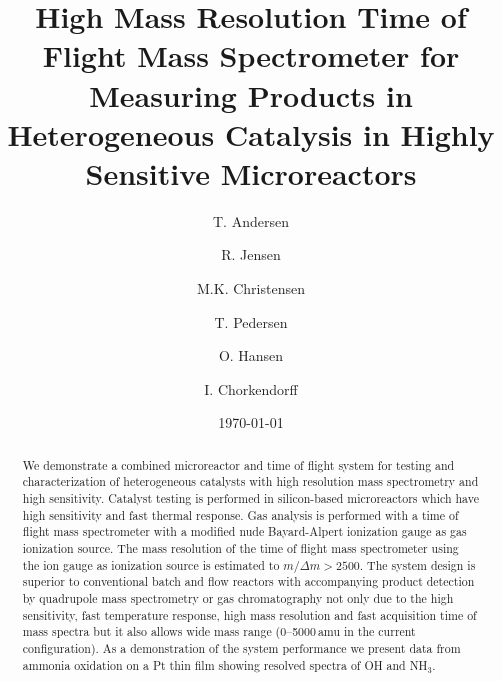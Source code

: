 \documentclass[aip,rsi]{revtex4-1}
\begin{document}
\title{High Mass Resolution Time of Flight Mass Spectrometer for Measuring Products in Heterogeneous Catalysis in Highly Sensitive Microreactors} 

\author{T. Andersen}
\author{R. Jensen}
\author{M.K. Christensen}
\author{T. Pedersen}
\author{O. Hansen}
\author{I. Chorkendorff}

\date{\today}

\begin{abstract}
We demonstrate a combined microreactor and time of flight system for testing and characterization of heterogeneous catalysts with high resolution mass spectrometry and high sensitivity. Catalyst testing is performed in silicon-based microreactors which have high sensitivity and fast thermal response. Gas analysis is performed with a time of flight mass spectrometer with a modified nude Bayard-Alpert ionization gauge as gas ionization source. The mass resolution of the time of flight mass spectrometer using the ion gauge as ionization source is estimated to $m/\Delta m>2500$. The system design is superior to conventional batch and flow reactors with accompanying product detection by quadrupole mass spectrometry or gas chromatography not only due to the high sensitivity, fast temperature response, high mass resolution and fast acquisition time of mass spectra but it also allows wide mass range (\mbox{0--5000}\,amu in the current configuration). As a demonstration of the system performance we present data from ammonia oxidation on a Pt thin film showing resolved spectra of OH and NH$_{3}$.
\end{abstract}

\pacs{}%

\maketitle 
\end{document}
